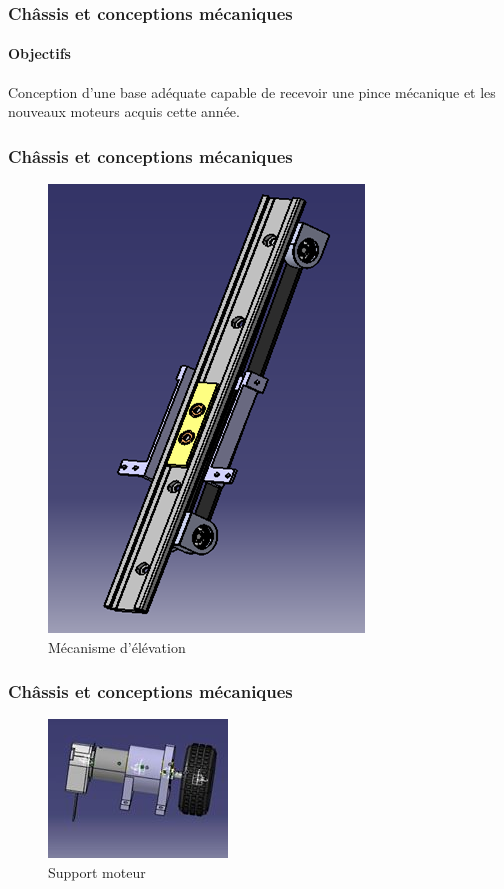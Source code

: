 \begin{frame}
\frametitle{Châssis et conceptions mécaniques}
\framesubtitle{Objectifs}
Conception d'une base adéquate capable de recevoir une pince mécanique et les nouveaux moteurs acquis cette année. 
\end{frame}

\begin{frame}
\frametitle{Châssis et conceptions mécaniques}
\begin{figure}[!ht]
	\includegraphics[scale=0.5]{chariot.png} 
	\caption{Mécanisme d'élévation}
\end{figure}
\end{frame}

\begin{frame}
\frametitle{Châssis et conceptions mécaniques}
\begin{figure}[!ht]
	\includegraphics[scale=0.5]{support.jpg}
	\caption{Support moteur} 
\end{figure}
\end{frame}

